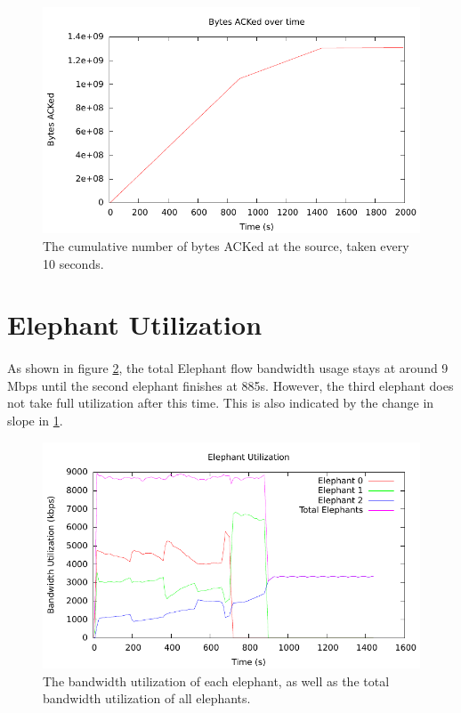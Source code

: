 \documentclass{article}
\begin{document}
    \begin{figure}[h]
      \begin{centering}
        \includegraphics{ack_plot}
        \caption{The cumulative number of bytes ACKed at the source, taken every 10 seconds.}
        \label{fig:ack_plot}
      \end{centering}
    \end{figure}

  \section{Elephant Utilization}

    \paragraph{}
      As shown in figure \ref{fig:elephant_bw}, the total Elephant flow bandwidth usage stays at around 9 Mbps until the second elephant finishes at 885s.
      However, the third elephant does not take full utilization after this time.
      This is also indicated by the change in slope in \ref{fig:ack_plot}.

    \begin{figure}[h]
      \begin{center}
        \includegraphics{elephant_bw}
        \caption{The bandwidth utilization of each elephant, as well as the total bandwidth utilization of all elephants.}
        \label{fig:elephant_bw}
      \end{center}
    \end{figure}
\end{document}
